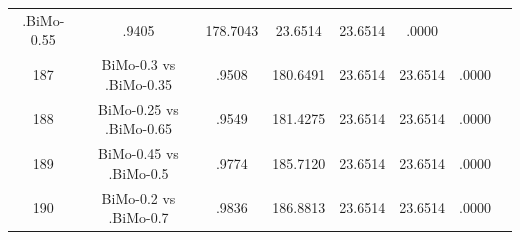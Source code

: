 \documentclass[a4paper,10pt]{article}
\begin{document}
\begin{landscape}
\begin{table}[!htp]
\begin{tabular}{cccccccc}
.BiMo-0.55&.9405&178.7043&23.6514&23.6514&.0000\\187&BiMo-0.3 vs .BiMo-0.35&.9508&180.6491&23.6514&23.6514&.0000\\188&BiMo-0.25 vs .BiMo-0.65&.9549&181.4275&23.6514&23.6514&.0000\\189&BiMo-0.45 vs .BiMo-0.5&.9774&185.7120&23.6514&23.6514&.0000\\190&BiMo-0.2 vs .BiMo-0.7&.9836&186.8813&23.6514&23.6514&.0000\\\hline
\end{tabular}
\end{table}

\end{landscape}
\end{document}
